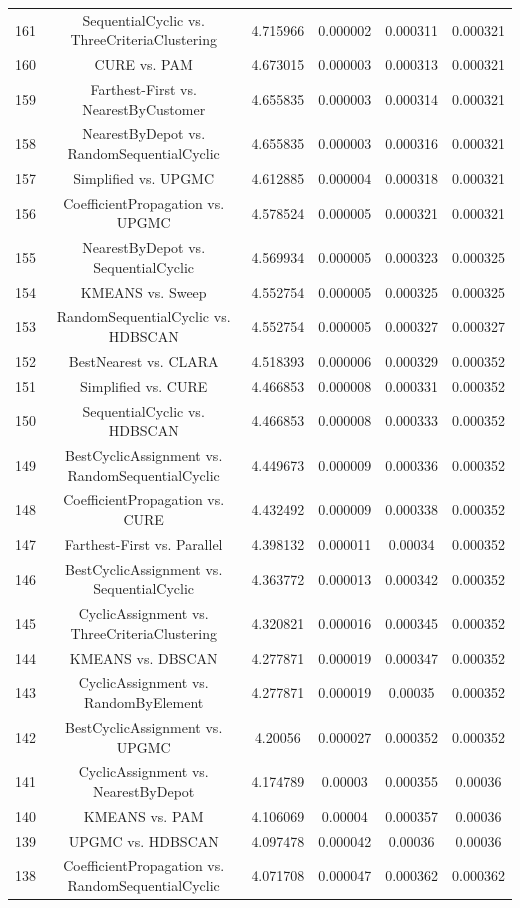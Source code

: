 \documentclass[a4paper,10pt]{article}
\begin{document}
\begin{landscape}
\begin{table}[!htp]
\begin{tabular}{cccccc}
161&SequentialCyclic vs. ThreeCriteriaClustering&4.715966&0.000002&0.000311&0.000321\\
160&CURE vs. PAM&4.673015&0.000003&0.000313&0.000321\\
159&Farthest-First vs. NearestByCustomer&4.655835&0.000003&0.000314&0.000321\\
158&NearestByDepot vs. RandomSequentialCyclic&4.655835&0.000003&0.000316&0.000321\\
157&Simplified vs. UPGMC&4.612885&0.000004&0.000318&0.000321\\
156&CoefficientPropagation vs. UPGMC&4.578524&0.000005&0.000321&0.000321\\
155&NearestByDepot vs. SequentialCyclic&4.569934&0.000005&0.000323&0.000325\\
154&KMEANS vs. Sweep&4.552754&0.000005&0.000325&0.000325\\
153&RandomSequentialCyclic vs. HDBSCAN&4.552754&0.000005&0.000327&0.000327\\
152&BestNearest vs. CLARA&4.518393&0.000006&0.000329&0.000352\\
151&Simplified vs. CURE&4.466853&0.000008&0.000331&0.000352\\
150&SequentialCyclic vs. HDBSCAN&4.466853&0.000008&0.000333&0.000352\\
149&BestCyclicAssignment vs. RandomSequentialCyclic&4.449673&0.000009&0.000336&0.000352\\
148&CoefficientPropagation vs. CURE&4.432492&0.000009&0.000338&0.000352\\
147&Farthest-First vs. Parallel&4.398132&0.000011&0.00034&0.000352\\
146&BestCyclicAssignment vs. SequentialCyclic&4.363772&0.000013&0.000342&0.000352\\
145&CyclicAssignment vs. ThreeCriteriaClustering&4.320821&0.000016&0.000345&0.000352\\
144&KMEANS vs. DBSCAN&4.277871&0.000019&0.000347&0.000352\\
143&CyclicAssignment vs. RandomByElement&4.277871&0.000019&0.00035&0.000352\\
142&BestCyclicAssignment vs. UPGMC&4.20056&0.000027&0.000352&0.000352\\
141&CyclicAssignment vs. NearestByDepot&4.174789&0.00003&0.000355&0.00036\\
140&KMEANS vs. PAM&4.106069&0.00004&0.000357&0.00036\\
139&UPGMC vs. HDBSCAN&4.097478&0.000042&0.00036&0.00036\\
138&CoefficientPropagation vs. RandomSequentialCyclic&4.071708&0.000047&0.000362&0.000362\\

\end{tabular}
\end{table}
\end{landscape}
\end{document}
